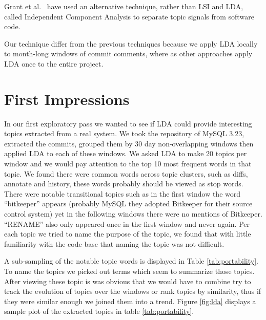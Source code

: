 \documentclass[times, 10pt,twocolumn]{article}
\begin{document}
Grant et al.~\cite{scottcordy} have used an alternative technique,
rather than LSI and LDA, called Independent Component Analysis to
separate topic signals from software code. 

Our technique differ from the previous techniques because we apply LDA
locally to month-long windows of commit comments, where as other
approaches apply LDA once to the entire project.




\section{First Impressions}

In our first exploratory pass we wanted to see if LDA could provide
interesting topics extracted from a real system. We took the
repository of MySQL 3.23, extracted the commits, grouped them by 30
day non-overlapping windows then applied LDA to each of these
windows. We asked LDA to make 20 topics per window and we would pay
attention to the top 10 most frequent words in that topic.  We found
there were common words across topic clusters, such as diffs, annotate
and history, these words probably should be viewed as stop
words. There were notable transitional topics such as in the first
window the word ``bitkeeper'' appears (probably MySQL they adopted
Bitkeeper for their source control system) yet in the following
windows there were no mentions of Bitkeeper. ``RENAME'' also only
appeared once in the first window and never again. Per each topic we
tried to name the purpose of the topic, we found that with little
familiarity with the code base that naming the topic was not difficult.

A sub-sampling of the notable topic words is displayed in Table
\ref{tab:portability}.  To name the topics we picked out terms which
seem to summarize those topics.  After viewing these topic is was
obvious that we would have to combine try to track the evolution of
topics over the windows or rank topics by similarity, thus if they
were similar enough we joined them into a trend. Figure \ref{fig:lda}
displays a sample plot of the extracted topics in table
\ref{tab:portability}.

\end{document}
